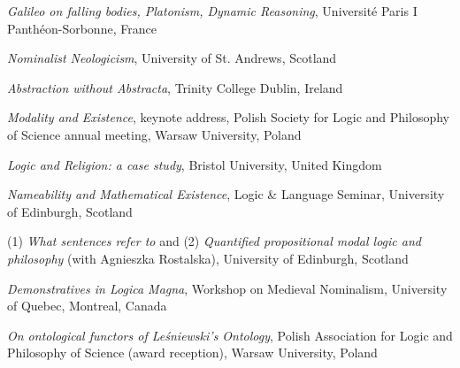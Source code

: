 \documentclass[10pt, a4paper]{article}
\newcommand{\years}[1]{\marginnote{\normalsize #1}}
\begin{document}
\emph{Galileo on falling bodies, Platonism, Dynamic Reasoning}, Universit\'e  Paris I Panth\'eon-Sorbonne, France





\vspace{0.5mm}

 \emph{Nominalist   Neologicism},  University of St. Andrews, Scotland


\vspace{0.5mm}

\emph{Abstraction without Abstracta},    Trinity College Dublin, Ireland


\vspace{0.5mm}


 \emph{Modality and Existence}, keynote address, Polish Society for Logic and Philosophy of Science annual \newline meeting,  Warsaw University, Poland


\vspace{0.5mm}



 \emph{Logic and Religion: a case study},    Bristol University, United Kingdom



\vspace{0.5mm}


\emph{Nameability and Mathematical Existence},  Logic \& Language Seminar,   University of Edinburgh, Scotland


\vspace{0.5mm}

\years{2008}
  (1) \emph{What   sentences   refer   to} and (2)
\emph{Quantified propositional modal  logic and philosophy} (with Agnieszka Rostalska),       University   of    Edinburgh,
Scotland


\vspace{0.5mm}



\years{2006} \emph{Demonstratives in Logica Magna}, Workshop on Medieval Nominalism,  University of Quebec, Montreal, Canada


\vspace{0.5mm}



 \years{2005}\emph{On ontological functors of Le{\'s}niewski's Ontology},  Polish Association for Logic and Philosophy of
Science (award reception),  Warsaw University, Poland

\vspace{1.5mm}
\end{document}
